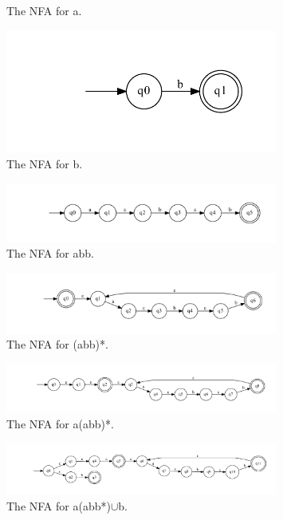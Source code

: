 \documentclass[10pt] {article}
\begin{document}
\begin{enumerate}
\begin{figure}[H]
\caption{The NFA for a.}
\label{31}
\end{figure}
\begin{figure}[H]
\includegraphics[width=0.8\textwidth]{ab28.pdf}
\caption{The NFA for b.}
\label{32}
\end{figure}
\begin{figure}[H]
\includegraphics[width=0.8\textwidth]{ac28.pdf}
\caption{The NFA for abb.}
\label{33}
\end{figure}
\begin{figure}[H]
\includegraphics[width=0.8\textwidth]{ad28.pdf}
\caption{The NFA for (abb)*.}
\label{34}
\end{figure}
\begin{figure}[H]
\includegraphics[width=0.8\textwidth]{ae28.pdf}
\caption{The NFA for a(abb)*.}
\label{35}
\end{figure}
\begin{figure}[H]
\includegraphics[width=0.8\textwidth]{af28.pdf}
\caption{The NFA for a(abb*)$\cup$b.}
\label{36}
\end{figure}

\end{enumerate}
\end{document}
